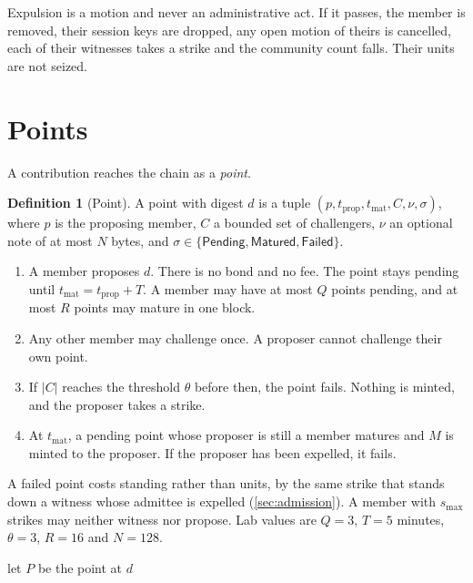 \documentclass[11pt,a4paper]{article}
\theoremstyle{definition}
\newtheorem{definition}{Definition}[section]
\theoremstyle{plain}
\theoremstyle{remark}
\begin{document}
Expulsion is a motion and never an administrative act. If it passes, the member is removed, their session keys are dropped, any open motion of theirs is cancelled, each of their witnesses takes a strike and the community count falls. Their units are not seized.

\section{Points}
\label{sec:points}

A contribution reaches the chain as a \emph{point}.

\begin{definition}[Point]
A point with digest $d$ is a tuple $(p, t_{\mathrm{prop}}, t_{\mathrm{mat}}, C, \nu, \sigma)$, where $p$ is the proposing member, $C$ a bounded set of challengers, $\nu$ an optional note of at most $N$ bytes, and $\sigma \in \{\mathsf{Pending}, \mathsf{Matured}, \mathsf{Failed}\}$.
\end{definition}

\begin{enumerate}
  \item A member proposes $d$. There is no bond and no fee. The point stays pending until $t_{\mathrm{mat}} = t_{\mathrm{prop}} + T$. A member may have at most $Q$ points pending, and at most $R$ points may mature in one block.
  \item Any other member may challenge once. A proposer cannot challenge their own point.
  \item If $|C|$ reaches the threshold $\theta$ before then, the point fails. Nothing is minted, and the proposer takes a strike.
  \item At $t_{\mathrm{mat}}$, a pending point whose proposer is still a member matures and $M$ is minted to the proposer. If the proposer has been expelled, it fails.
\end{enumerate}

A failed point costs standing rather than units, by the same strike that stands down a witness whose admittee is expelled (\cref{sec:admission}). A member with $s_{\max}$ strikes may neither witness nor propose. Lab values are $Q = 3$, $T = 5$ minutes, $\theta = 3$, $R = 16$ and $N = 128$.

\begin{algorithm}[h]
\caption{Mature a due digest, called from \texttt{on\_initialize}}
\label{alg:mature}
let $P$ be the point at $d$\;
\end{algorithm}
\end{document}
